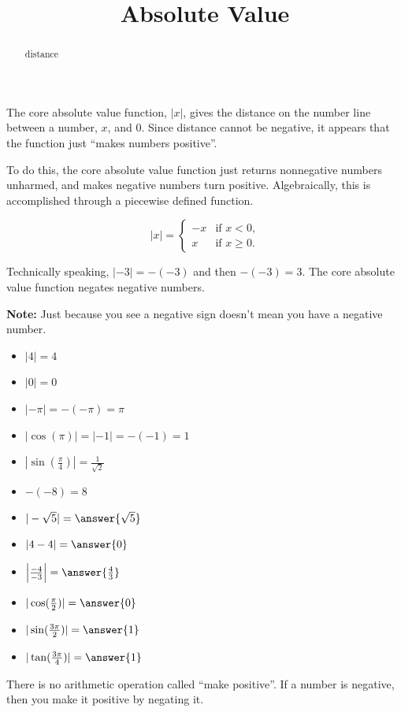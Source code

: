 \documentclass{ximera}
\title{Absolute Value}
\begin{document}
\begin{abstract}
distance
\end{abstract}
\maketitle



The core absolute value function, $|x|$, gives the distance on the number line between a number, $x$, and $0$.  Since distance cannot be negative, it appears that the function just ``makes numbers positive''.


To do this, the core absolute value function just returns nonnegative numbers unharmed, and makes negative numbers turn positive.  Algebraically, this is accomplished through a piecewise defined function.






\[
|x| = 
\begin{cases}
  -x &\text{if $x<0$,}\\
  x & \text{if $x\ge 0$}.
\end{cases}
\]


Technically speaking, $|-3| = -(-3)$ and then $-(-3) = 3$.  The core absolute value function negates negative numbers.


\textbf{Note:} Just because you see a negative sign doesn't mean you have a negative number.



\begin{example}
\begin{itemize}
\item $|4| = 4$
\item $|0| = 0$
\item $|-\pi| = -(-\pi) = \pi$
\item $|\cos(\pi)| = |-1| = -(-1) = 1$
\item $|\sin(\tfrac{\pi}{4})| = \tfrac{1}{\sqrt{2}}$
\item $-(-8) = 8$
\end{itemize}
\end{example}





\begin{example}
\begin{itemize}
\item $|-\sqrt{5}| = \answer{\sqrt{5}}$
\item $|4-4| = \answer{0}$
\item $\left|\frac{-4}{-3}\right| = \answer{\frac{4}{3}}$
\item $|\cos(\tfrac{\pi}{2})| = \answer{0}$
\item $|\sin(\tfrac{3\pi}{2})| = \answer{1}$
\item $|\tan(\tfrac{3\pi}{4})| = \answer{1}$
\end{itemize}
\end{example}
There is no arithmetic operation called ``make positive''.  If a number is negative, then you make it positive by negating it. 
\end{document}
